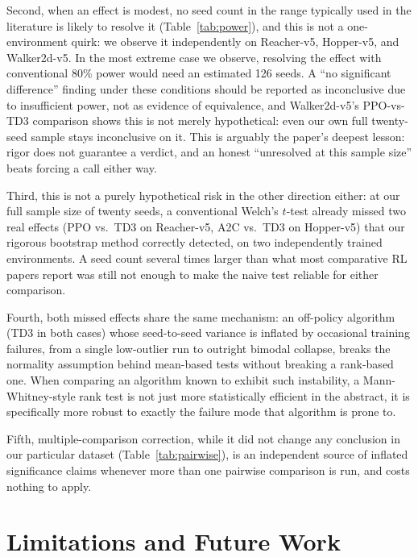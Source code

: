 \documentclass[journal]{IEEEtran}
\begin{document}
Second, when an effect is modest, no seed count in the range typically used in the literature is
likely to resolve it (Table~\ref{tab:power}), and this is not a one-environment quirk: we observe
it independently on Reacher-v5, Hopper-v5, and Walker2d-v5. In the most extreme case we observe,
resolving the effect with conventional 80\% power would need an estimated 126 seeds. A ``no
significant difference'' finding under these conditions should be reported as inconclusive due to
insufficient power, not as evidence of equivalence, and Walker2d-v5's PPO-vs-TD3 comparison shows
this is not merely hypothetical: even our own full twenty-seed sample stays inconclusive on it. This
is arguably the paper's deepest lesson: rigor does not guarantee a verdict, and an honest
``unresolved at this sample size'' beats forcing a call either way.

Third, this is not a purely hypothetical risk in the other direction either: at our full sample
size of twenty seeds, a conventional Welch's $t$-test already missed two real effects (PPO vs.\
TD3 on Reacher-v5, A2C vs.\ TD3 on Hopper-v5) that our rigorous bootstrap method correctly
detected, on two independently trained environments. A seed count several times larger than what
most comparative RL papers report was still not enough to make the naive test reliable for either
comparison.

Fourth, both missed effects share the same mechanism: an off-policy algorithm (TD3 in both cases)
whose seed-to-seed variance is inflated by occasional training failures, from a single low-outlier
run to outright bimodal collapse, breaks the normality assumption behind mean-based tests without
breaking a rank-based one. When comparing an algorithm known to exhibit such instability, a
Mann-Whitney-style rank test is not just more statistically efficient in the abstract, it is
specifically more robust to exactly the failure mode that algorithm is prone to.

Fifth, multiple-comparison correction, while it did not change any conclusion in our particular
dataset (Table~\ref{tab:pairwise}), is an independent source of inflated significance claims
whenever more than one pairwise comparison is run, and costs nothing to apply.

\section{Limitations and Future Work}
\end{document}
